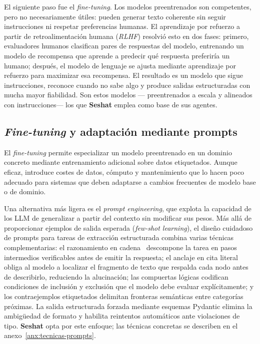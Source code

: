 El siguiente paso fue el \textit{fine-tuning}. Los modelos preentrenados son competentes, pero no
necesariamente útiles: pueden generar texto coherente sin seguir instrucciones ni respetar
preferencias humanas. El aprendizaje por refuerzo a partir de retroalimentación humana
(\textit{RLHF}) resolvió esto en dos fases: primero, evaluadores humanos clasifican pares de
respuestas del modelo, entrenando un modelo de recompensa que aprende a predecir qué respuesta
preferiría un humano; después, el modelo de lenguaje se ajusta mediante aprendizaje por refuerzo
para maximizar esa recompensa. El resultado es un modelo que sigue instrucciones, reconoce cuando
no sabe algo y produce salidas estructuradas con mucha mayor fiabilidad. Son estos modelos —
preentrenados a escala y alineados con instrucciones— los que \textbf{Seshat} emplea como base
de sus agentes.

\subsection{\textit{Fine-tuning} y adaptación mediante prompts}

El \textit{fine-tuning} permite especializar un modelo preentrenado en un dominio concreto
mediante entrenamiento adicional sobre datos etiquetados. Aunque eficaz, introduce costes de
datos, cómputo y mantenimiento que lo hacen poco adecuado para sistemas que deben adaptarse a
cambios frecuentes de modelo base o de dominio.

Una alternativa más ligera es el \textit{prompt engineering}, que explota la capacidad de los
\ac{LLM} de generalizar a partir del contexto sin modificar sus pesos. Más allá de proporcionar
ejemplos de salida esperada (\textit{few-shot learning}), el diseño cuidadoso de prompts para
tareas de extracción estructurada combina varias técnicas complementarias: el razonamiento en
cadena~\cite{wei2022cot} descompone la tarea en pasos intermedios verificables antes de emitir
la respuesta; el anclaje en cita literal obliga al modelo a localizar el fragmento de texto que
respalda cada nodo antes de describirlo, reduciendo la alucinación; las compuertas lógicas
codifican condiciones de inclusión y exclusión que el modelo debe evaluar explícitamente; y los
contraejemplos etiquetados delimitan fronteras semánticas entre categorías próximas. La salida
estructurada forzada mediante esquemas Pydantic elimina la ambigüedad de formato y habilita
reintentos automáticos ante violaciones de tipo. \textbf{Seshat} opta por este enfoque; las
técnicas concretas se describen en el anexo~\ref{anx:tecnicas-prompts}.

